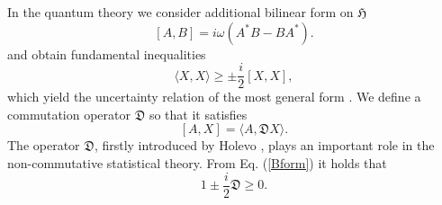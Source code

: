 In the quantum theory we consider additional bilinear form on $\mathfrak{H}$ 
\begin{equation}\label{Bform}
[A,B]=i\omega(A^{\ast}B-BA^{\ast}).
\end{equation}
and  obtain fundamental inequalities 
$$
\langle X, X\rangle \geq \pm \frac{i}{2}[X,X],
$$
which yield  the uncertainty relation of the most general form \cite{Holevo_1977}.
We define a commutation operator $\mathfrak{D}$ so that it satisfies 
\begin{equation}\label{Copr}
[A,X]=\langle A, \mathfrak{D}X\rangle.
\end{equation}
The operator $\mathfrak{D}$, firstly introduced by Holevo \cite{Holevo_1977}, plays an important role in the non-commutative statistical theory. From Eq. (\ref{Bform}) it holds that 
\begin{equation}
1\pm \frac{i}{2}\mathfrak{D}\geq 0.
\end{equation}

